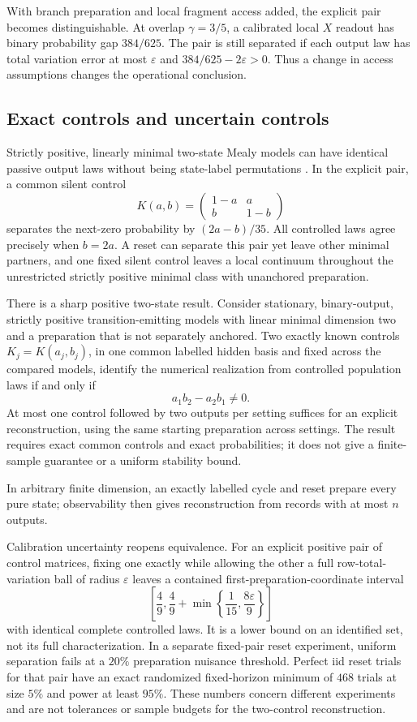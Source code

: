 With branch preparation and local fragment access added, the explicit
pair becomes distinguishable.  At overlap \(\gamma=3/5\), a calibrated
local \(X\) readout has binary probability gap \(384/625\).
The pair is still separated if each output law has total variation error
at most \(\varepsilon\) and \(384/625-2\varepsilon>0\).
Thus a change in access assumptions changes the operational conclusion.

\subsection{Exact controls and uncertain controls}

Strictly positive, linearly minimal two-state Mealy models can have
identical passive output laws without being state-label permutations
\cite{op:vanluyten}.  In the explicit pair, a common silent control
\[
 K(a,b)=\begin{pmatrix}1-a&a\\b&1-b\end{pmatrix}
\]
separates the next-zero probability by \((2a-b)/35\).
All controlled laws agree precisely when \(b=2a\).
A reset can separate this pair yet leave other minimal partners, and
one fixed silent control leaves a local continuum throughout the
unrestricted strictly positive minimal class with unanchored preparation.

There is a sharp positive two-state result.  Consider stationary,
binary-output, strictly positive transition-emitting models with
linear minimal dimension two and a preparation that is not separately
anchored.  Two exactly known controls \(K_j=K(a_j,b_j)\), in one common
labelled hidden basis and fixed across the compared models, identify
the numerical realization from controlled population laws if and only if
\[
 a_1b_2-a_2b_1\ne0.
\]
At most one control followed by two outputs per setting suffices for an
explicit reconstruction, using the same starting preparation across
settings.  The result requires exact common controls and exact
probabilities; it does not give a finite-sample guarantee or a uniform
stability bound.

In arbitrary finite dimension, an exactly labelled cycle and reset
prepare every pure state; observability then gives reconstruction from
records with at most \(n\) outputs.

Calibration uncertainty reopens equivalence.  For an explicit positive
pair of control matrices, fixing one exactly while allowing the other
a full row-total-variation ball of radius \(\varepsilon\) leaves a
contained first-preparation-coordinate interval
\[
 \left[\frac49,\frac49+
       \min\left\{\frac1{15},\frac{8\varepsilon}{9}\right\}\right]
\]
with identical complete controlled laws.  It is a lower bound on an
identified set, not its full characterization.  In a separate fixed-pair
reset experiment, uniform separation fails at a \(20\%\) preparation
nuisance threshold.  Perfect iid reset trials for that pair have an
exact randomized fixed-horizon minimum of \(468\) trials at size \(5\%\)
and power at least \(95\%\).  These numbers concern different
experiments and are not tolerances or sample budgets for the
two-control reconstruction.

